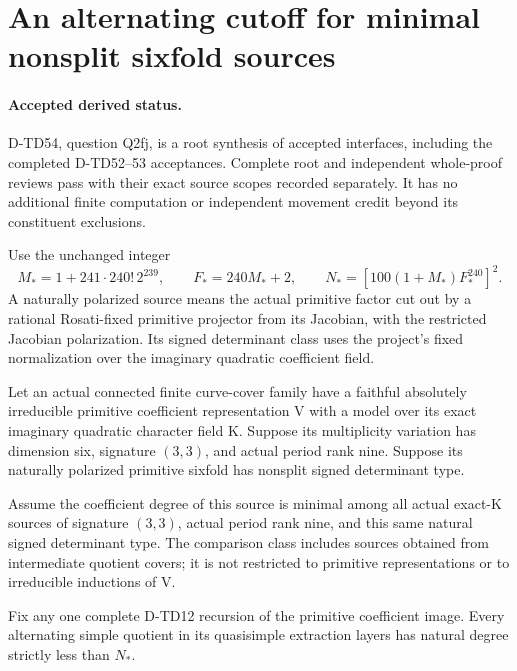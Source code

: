 \section{An alternating cutoff for minimal nonsplit sixfold sources}
\label{sec:minimal-nonsplit-alternating-cutoff}

\paragraph{Accepted derived status.}
D-TD54, question Q2fj, is a root synthesis of accepted
interfaces, including the completed D-TD52--53 acceptances.
Complete root and independent whole-proof reviews pass with
their exact source scopes recorded separately. It has no additional
finite computation or independent movement credit beyond its
constituent exclusions.

Use the unchanged integer
\[
 M_*=1+241\cdot240!\,2^{239},\qquad F_*=240M_*+2,
 \qquad N_*=[100(1+M_*)F_*^{240}]^2.
 \tag{MAC.1}
\]
A naturally polarized source means the actual primitive factor cut
out by a rational Rosati-fixed primitive projector from its Jacobian,
with the restricted Jacobian polarization. Its signed determinant
class uses the project's fixed normalization over the imaginary
quadratic coefficient field.

\begin{theorem}[D-TD54]
Let an actual connected finite curve-cover family have a faithful
absolutely irreducible primitive coefficient representation V with a
model over its exact imaginary quadratic character field K. Suppose
its multiplicity variation has dimension six, signature \((3,3)\),
and actual period rank nine. Suppose its naturally polarized primitive
sixfold has nonsplit signed determinant type.

Assume the coefficient degree of this source is minimal among all
actual exact-K sources of signature \((3,3)\), actual period rank nine,
and this same natural signed determinant type. The comparison class
includes sources obtained from intermediate quotient covers; it is
not restricted to primitive representations or to irreducible
inductions of V.

Fix any one complete D-TD12 recursion of the primitive coefficient
image. Every alternating simple quotient in its quasisimple extraction
layers has natural degree strictly less than \(N_*\).
\end{theorem}

